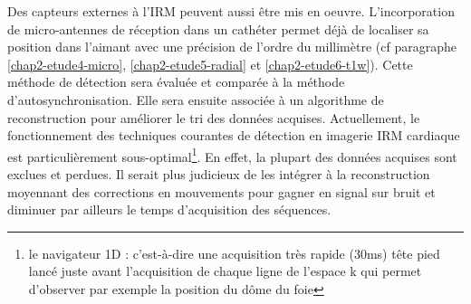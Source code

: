 
Des capteurs externes à l’IRM peuvent aussi être mis en oeuvre. L’incorporation de micro-antennes de réception dans un cathéter permet déjà de localiser sa position dans l’aimant avec une précision de l’ordre du millimètre (cf paragraphe \ref{chap2-etude4-micro}, \ref{chap2-etude5-radial} et \ref{chap2-etude6-t1w}). Cette méthode de détection sera évaluée et comparée à la méthode d’autosynchronisation. Elle sera ensuite associée à un algorithme de reconstruction pour améliorer le tri des données acquises. Actuellement, le fonctionnement des techniques courantes de détection en imagerie IRM cardiaque est particulièrement sous-optimal\footnote{le navigateur 1D : c’est-à-dire une acquisition très rapide (30ms) tête pied lancé juste avant l’acquisition de chaque ligne de l’espace k qui permet d’observer par exemple la position du dôme du foie}. En effet, la plupart des données acquises sont exclues et perdues. Il serait plus judicieux de les intégrer à la reconstruction moyennant des corrections en mouvements pour gagner en signal sur bruit et diminuer par ailleurs le temps d’acquisition des séquences.\\
